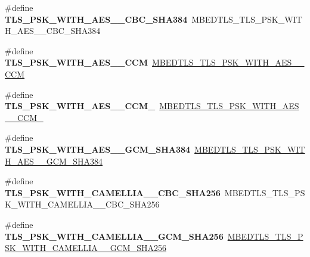 \begin{DoxyCompactItemize}
\item 
\mbox{\label{compat-1_83_8h_a5a8c3f6ccf5ad9a631482cd9a44226e8}} 
\#define {\bfseries T\+L\+S\+\_\+\+P\+S\+K\+\_\+\+W\+I\+T\+H\+\_\+\+A\+E\+S\+\_\+\_\+\+C\+B\+C\+\_\+\+S\+H\+A384}~M\+B\+E\+D\+T\+L\+S\+\_\+\+T\+L\+S\+\_\+\+P\+S\+K\+\_\+\+W\+I\+T\+H\+\_\+\+A\+E\+S\+\_\+\_\+\+C\+B\+C\+\_\+\+S\+H\+A384
\item 
\mbox{\label{compat-1_83_8h_ad4d5a7d1e4654f2ea9b0c12e9d71648a}} 
\#define {\bfseries T\+L\+S\+\_\+\+P\+S\+K\+\_\+\+W\+I\+T\+H\+\_\+\+A\+E\+S\+\_\+\_\+\+C\+CM}~\mbox{\hyperlink{ssl__ciphersuites_8h_ad6ad788d7288c59a5a473450884e3c9d}{M\+B\+E\+D\+T\+L\+S\+\_\+\+T\+L\+S\+\_\+\+P\+S\+K\+\_\+\+W\+I\+T\+H\+\_\+\+A\+E\+S\+\_\+\_\+\+C\+CM}}
\item 
\mbox{\label{compat-1_83_8h_af17e9064ddeda1fe2b288576f493dd97}} 
\#define {\bfseries T\+L\+S\+\_\+\+P\+S\+K\+\_\+\+W\+I\+T\+H\+\_\+\+A\+E\+S\+\_\+\_\+\+C\+C\+M\+\_}~\mbox{\hyperlink{ssl__ciphersuites_8h_ab8f3a8b0f488d78fd91c81b7d287a583}{M\+B\+E\+D\+T\+L\+S\+\_\+\+T\+L\+S\+\_\+\+P\+S\+K\+\_\+\+W\+I\+T\+H\+\_\+\+A\+E\+S\+\_\+\_\+\+C\+C\+M\+\_}}
\item 
\mbox{\label{compat-1_83_8h_acc44ad6d12ee191dd30d1f3d373b6e4d}} 
\#define {\bfseries T\+L\+S\+\_\+\+P\+S\+K\+\_\+\+W\+I\+T\+H\+\_\+\+A\+E\+S\+\_\+\_\+\+G\+C\+M\+\_\+\+S\+H\+A384}~\mbox{\hyperlink{ssl__ciphersuites_8h_a0cff69d96ab1ee0dd5eaef6fe2a5a592}{M\+B\+E\+D\+T\+L\+S\+\_\+\+T\+L\+S\+\_\+\+P\+S\+K\+\_\+\+W\+I\+T\+H\+\_\+\+A\+E\+S\+\_\+\_\+\+G\+C\+M\+\_\+\+S\+H\+A384}}
\item 
\mbox{\label{compat-1_83_8h_a898f6fba67023bcffd118c751c1d52e4}} 
\#define {\bfseries T\+L\+S\+\_\+\+P\+S\+K\+\_\+\+W\+I\+T\+H\+\_\+\+C\+A\+M\+E\+L\+L\+I\+A\+\_\+\_\+\+C\+B\+C\+\_\+\+S\+H\+A256}~M\+B\+E\+D\+T\+L\+S\+\_\+\+T\+L\+S\+\_\+\+P\+S\+K\+\_\+\+W\+I\+T\+H\+\_\+\+C\+A\+M\+E\+L\+L\+I\+A\+\_\+\_\+\+C\+B\+C\+\_\+\+S\+H\+A256
\item 
\mbox{\label{compat-1_83_8h_a88a1f43800a010e5fc8d18ac694f5d01}} 
\#define {\bfseries T\+L\+S\+\_\+\+P\+S\+K\+\_\+\+W\+I\+T\+H\+\_\+\+C\+A\+M\+E\+L\+L\+I\+A\+\_\+\_\+\+G\+C\+M\+\_\+\+S\+H\+A256}~\mbox{\hyperlink{ssl__ciphersuites_8h_afec870e616180efaa258455a2c0f72f6}{M\+B\+E\+D\+T\+L\+S\+\_\+\+T\+L\+S\+\_\+\+P\+S\+K\+\_\+\+W\+I\+T\+H\+\_\+\+C\+A\+M\+E\+L\+L\+I\+A\+\_\+\_\+\+G\+C\+M\+\_\+\+S\+H\+A256}}

\end{DoxyCompactItemize}
